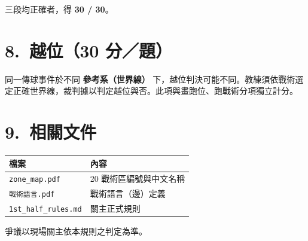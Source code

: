 \documentclass[11pt]{article}
\newcommand{\term}[1]{\textbf{#1}}
\begin{document}
\vspace{0.4em}
\noindent
三段均正確者，得 \textbf{30 / 30}。

\section*{8.\ 越位（30 分／題）}

同一傳球事件於不同 \term{參考系（世界線）} 下，越位判決可能不同。教練須依戰術選定正確世界線，裁判據以判定越位與否。此項與畫跑位、跑戰術分項獨立計分。

\section*{9.\ 相關文件}

\vspace{0.3em}
\begin{tabular}{@{}ll@{}}
\toprule
\textbf{檔案} & \textbf{內容} \\
\midrule
\texttt{zone\_map.pdf} & 20 戰術區編號與中文名稱 \\
\texttt{戰術語言.pdf} & 戰術語言（邊）定義 \\
\texttt{1st\_half\_rules.md} & 關主正式規則 \\
\bottomrule
\end{tabular}

\vspace{1em}
\noindent
爭議以現場關主依本規則之判定為準。
\end{document}
